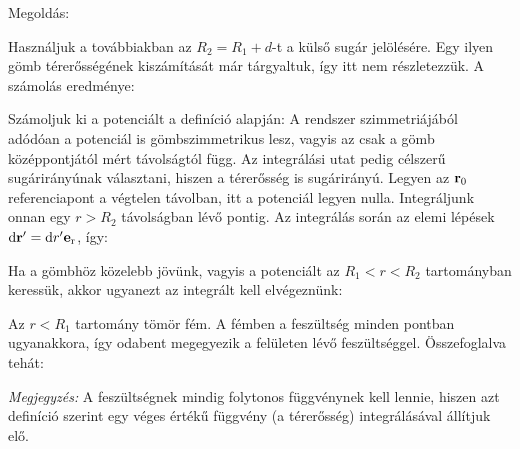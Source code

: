 
\ifdefined\megoldas
 
 Megoldás: 

 Használjuk a továbbiakban az $R_2=R_1+d$-t a külső sugár jelölésére. Egy ilyen gömb térerősségének kiszámítását már tárgyaltuk, így itt nem részletezzük. A számolás eredménye:

 Számoljuk ki a potenciált a definíció alapján:
 A rendszer szimmetriájából adódóan a potenciál is gömbszimmetrikus lesz, vagyis az csak a gömb középpontjától mért távolságtól függ. Az integrálási utat pedig célszerű sugárirányúnak választani, hiszen a térerősség is sugárirányú. Legyen az $\mathbf{r}_0$ referenciapont a végtelen távolban, itt a potenciál legyen nulla. Integráljunk onnan egy $r>R_2$ távolságban lévő pontig. Az integrálás során az elemi lépések $\mathrm{d}\mathbf{r}'=\mathrm{d} r'\mathbf{e}_\text{r}$, így:

 Ha a gömbhöz közelebb jövünk, vagyis a potenciált az $R_1<r<R_2$ tartományban keressük, akkor ugyanezt az integrált kell elvégeznünk:

 Az $r<R_1$ tartomány tömör fém. A fémben a feszültség minden pontban ugyanakkora, így odabent megegyezik a felületen lévő feszültséggel. Összefoglalva tehát:

 \emph{Megjegyzés:} A feszültségnek mindig folytonos függvénynek kell lennie, hiszen azt definíció szerint egy véges értékű függvény (a térerősség) integrálásával állítjuk elő.

\fi